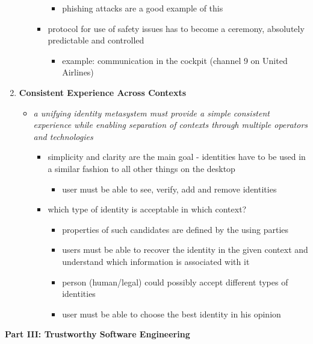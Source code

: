 \documentclass[11pt]{article}
\begin{document}
\begin{enumerate}
\begin{itemize}
\begin{itemize}
\begin{itemize}
\item phishing attacks are a good example of this
\end{itemize}
\item protocol for use of safety issues has to become a ceremony, absolutely predictable and controlled
\begin{itemize}
\item example: communication in the cockpit (channel 9 on United Airlines)
\end{itemize}
\end{itemize}
\end{itemize}
\item \textbf{Consistent Experience Across Contexts}
\begin{itemize}
\item \emph{a unifying identity metasystem must provide a simple consistent experience while enabling separation of contexts through multiple operators and technologies}
\begin{itemize}
\item simplicity and clarity are the main goal - identities have to be used in a similar fashion to all other things on the desktop
\begin{itemize}
\item user must be able to see, verify, add and remove identities
\end{itemize}
\item which type of identity is acceptable in which context?
\begin{itemize}
\item properties of such candidates are defined by the using parties
\item users must be able to recover the identity in the given context and understand which information is associated with it
\item person (human/legal) could possibly accept different types of identities
\item user must be able to choose the best identity in his opinion
\end{itemize}
\end{itemize}
\end{itemize}
\end{enumerate}
\textbf{Part III: Trustworthy Software Engineering}\\
\end{document}
